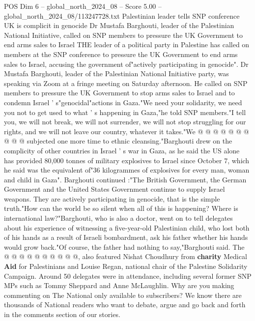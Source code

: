 \begin{textsample}{POS Dim 6 – global\_north\_2024\_08 – Score 5.00 – global\_north\_2024\_08/113247728.txt}  \label{ex:f6_pos_380}
Palestinian leader tells SNP conference UK is complicit in genocide Dr Mustafa Barghouti, leader of the Palestinian National Initiative, called on SNP members to pressure the UK Government to end arms sales to Israel THE leader of a political party in Palestine has called on members at the SNP conference to pressure the UK Government to end arms sales to Israel, accusing the government of"actively participating in genocide".
Dr Mustafa Barghouti, leader of the Palestinian National Initiative party, was speaking via Zoom at a fringe meeting on Saturday afternoon.
He called on SNP members to pressure the UK Government to stop arms sales to Israel and to condemn Israel ' s"genocidal"actions in Gaza."We need your solidarity, we need you not to get used to what ' s happening in Gaza,"he told SNP members."I tell you, we will not break, we will not surrender, we will not stop struggling for our rights, and we will not leave our country, whatever it takes."We @ @ @ @ @ @ @ @ @ @ subjected one more time to ethnic cleansing."Barghouti drew on the complicity of other countries in Israel ' s war in Gaza, as he said the US alone has provided 80,000 tonnes of military explosives to Israel since October 7, which he said was the equivalent of"36 kilogrammes of explosives for every man, woman and child in Gaza".
Barghouti continued :"The British Government, the German Government and the United States Government continue to supply Israel weapons.
They are actively participating in genocide, that is the simple truth."How can the world be so silent when all of this is happening?
Where is international law?"Barghouti, who is also a doctor, went on to tell delegates about his experience of witnessing a five-year-old Palestinian child, who lost both of his hands as a result of Israeli bombardment, ask his father whether his hands would grow back."Of course, the father had nothing to say,"Barghouti said.
The @ @ @ @ @ @ @ @ @ @, also featured Nishat Choudhury from \textbf{charity} Medical \textbf{Aid} for Palestinians and Louise Regan, national chair of the Palestine Solidarity Campaign.
Around 50 delegates were in attendance, including several former SNP MPs such as Tommy Sheppard and Anne McLaughlin.
Why are you making commenting on The National only available to subscribers?
We know there are thousands of National readers who want to debate, argue and go back and forth in the comments section of our stories.

\end{textsample}
